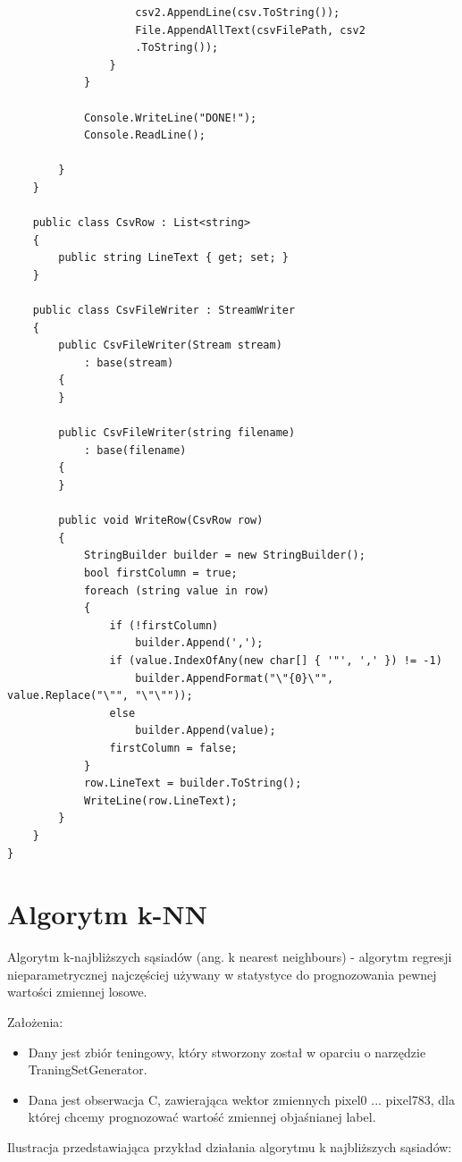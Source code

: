 \documentclass[brudnopis]{xmgr}
\begin{document}
\begin{lstlisting}
                    csv2.AppendLine(csv.ToString());
                    File.AppendAllText(csvFilePath, csv2
                    .ToString());
                }
            }

            Console.WriteLine("DONE!");
            Console.ReadLine();

        }
    }

    public class CsvRow : List<string>
    {
        public string LineText { get; set; }
    }

    public class CsvFileWriter : StreamWriter
    {
        public CsvFileWriter(Stream stream)
            : base(stream)
        {
        }

        public CsvFileWriter(string filename)
            : base(filename)
        {
        }

        public void WriteRow(CsvRow row)
        {
            StringBuilder builder = new StringBuilder();
            bool firstColumn = true;
            foreach (string value in row)
            {
                if (!firstColumn)
                    builder.Append(',');
                if (value.IndexOfAny(new char[] { '"', ',' }) != -1)
                    builder.AppendFormat("\"{0}\"", value.Replace("\"", "\"\""));
                else
                    builder.Append(value);
                firstColumn = false;
            }
            row.LineText = builder.ToString();
            WriteLine(row.LineText);
        }
    }
}
\end{lstlisting}

\section{Algorytm k-NN}

Algorytm k-najbliższych sąsiadów (ang. k nearest neighbours) - algorytm regresji nieparametrycznej najczęściej używany w statystyce do prognozowania pewnej wartości zmiennej losowe.

Założenia:
\begin{itemize}
\item
Dany jest zbiór teningowy, który stworzony został w oparciu o narzędzie TraningSetGenerator.
\item
Dana jest obserwacja C, zawierająca wektor zmiennych pixel0 ... pixel783, dla której chcemy prognozować wartość zmiennej objaśnianej label.
\end{itemize}	

   Ilustracja przedstawiająca przykład działania algorytmu k najbliższych sąsiadów:
\end{document}
